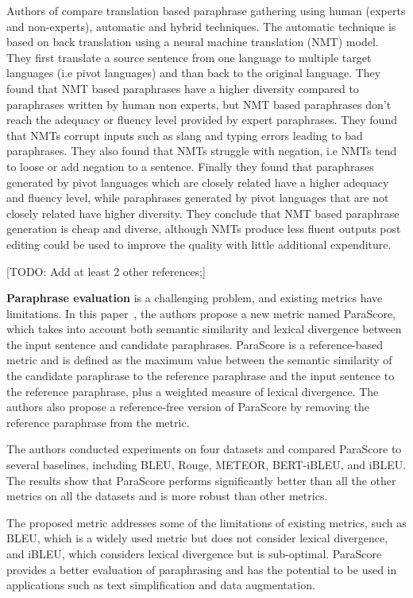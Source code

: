 \documentclass[fleqn,moreauthors,10pt]{ds_report}
\begin{document}
Authors of \cite{federmann-etal-2019-multilingual} compare translation based paraphrase gathering using human (experts and non-experts), automatic and hybrid techniques. The automatic technique is based on back translation using a neural machine translation (NMT) model. They first translate a source sentence from one language to multiple target languages (i.e pivot languages) and than back to the original language. They found that NMT based paraphrases have a higher diversity compared to
paraphrases written by human non experts, but NMT based paraphrases don't reach the adequacy or fluency level provided by expert paraphrases. They found that NMTs corrupt inputs such as slang and typing errors leading to bad paraphrases. They also found that NMTs struggle with negation, i.e NMTs tend to loose or add negation to a sentence. Finally they found that paraphrases generated by pivot languages which are closely related have a higher adequacy and fluency level, while paraphrases generated by pivot languages that are not closely related have higher diversity. They conclude that NMT based paraphrase generation is cheap and diverse, although NMTs produce less fluent outputs post editing could be used to improve the quality with little additional expenditure.

	[TODO: Add at least 2 other references;]

\textbf{Paraphrase evaluation} is a challenging problem, and existing metrics have limitations. In this paper~\cite{evaluation-metrics-in-paraphrase-generation}, the authors propose a new metric named ParaScore, which takes into account both semantic similarity and lexical divergence between the input sentence and candidate paraphrases. ParaScore is a reference-based metric and is defined as the maximum value between the semantic similarity of the candidate paraphrase to the reference paraphrase and the input sentence to the reference paraphrase, plus a weighted measure of lexical divergence. The authors also propose a reference-free version of ParaScore by removing the reference paraphrase from the metric.

The authors conducted experiments on four datasets and compared ParaScore to several baselines, including BLEU, Rouge, METEOR, BERT-iBLEU, and iBLEU. The results show that ParaScore performs significantly better than all the other metrics on all the datasets and is more robust than other metrics.

The proposed metric addresses some of the limitations of existing metrics, such as BLEU, which is a widely used metric but does not consider lexical divergence, and iBLEU, which considers lexical divergence but is sub-optimal. ParaScore provides a better evaluation of paraphrasing and has the potential to be used in applications such as text simplification and data augmentation.
\end{document}
